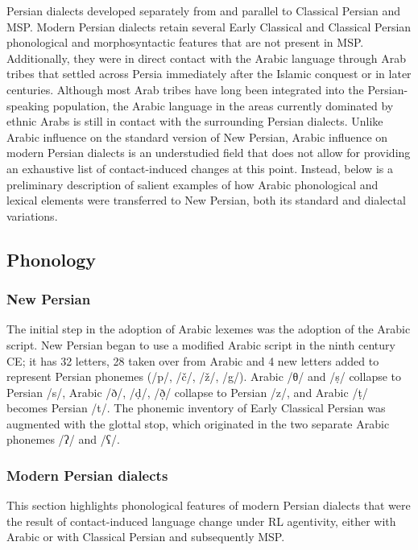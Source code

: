 \documentclass[output=paper]{langsci/langscibook}
\begin{document}
Persian dialects developed separately from and parallel to Classical Persian and MSP. Modern Persian dialects retain several Early Classical and Classical Persian phonological and morphosyntactic features that are not present in MSP. Additionally, they were in direct contact with the Arabic language through Arab tribes that settled across Persia immediately after the Islamic conquest or in later centuries. Although most Arab tribes have long been integrated into the Persian-speaking population, the Arabic language in the areas currently dominated by ethnic Arabs is still in contact with the surrounding Persian dialects. Unlike Arabic influence on the standard version of New Persian, Arabic influence on modern Persian dialects is an understudied field that does not allow for providing an exhaustive list of contact-induced changes at this point. Instead, below is a preliminary description of salient examples of how Arabic phonological and lexical elements were transferred to New Persian, both its standard and dialectal variations.

\subsection{Phonology}


\subsubsection{New Persian}

The initial step in the adoption of Arabic lexemes was the adoption of the Arabic script. New Persian began to use a modified Arabic script in the ninth century CE; it has 32 letters, 28 taken over from Arabic and 4 new letters added to represent Persian phonemes (/p/, /č/, /ž/, /g/). Arabic /θ/ and /ṣ/ collapse to Persian /s/, Arabic /ð/, /ḍ/, /ð̣/ collapse to Persian /z/, and Arabic /ṭ/ becomes Persian /t/. The phonemic inventory of Early Classical Persian was augmented with the glottal stop, which originated in the two separate Arabic phonemes /ʔ/ and /ʕ/.

\subsubsection{Modern Persian dialects}

This section highlights phonological features of modern Persian dialects that were the result of contact-induced language change under RL agentivity, either with Arabic or with Classical Persian and subsequently MSP.
\end{document}
